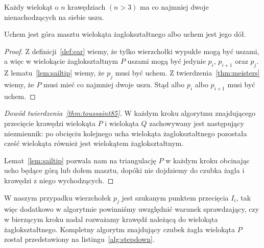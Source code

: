 \begin{twierdzenie} Każdy wielokąt
  o $n$ krawędziach $(n > 3)$ ma co najmniej dwoje nienachodzących na
  siebie uszu.
\end{twierdzenie}

\begin{lemat}\label{lem:sailmast}\emph{\cite{ToussaintInt}}
  Uchem jest góra masztu wielokąta żaglokształtnego albo uchem jest
  jego dół.
\end{lemat}

\begin{proof}
  Z definicji~\ref{def:ear} wiemy, że tylko wierzchołki wypukłe mogą
  być uszami, a więc w wielokącie żaglokształtnym $P$ uszami mogą być
  jedynie $p_i$, $p_{i+1}$ oraz $p_j$. Z lematu~\ref{lem:sailtip}
  wiemy, że $p_j$ musi być uchem. Z twierdzenia~\ref{thm:meisters}
  wiemy, że $P$ musi mieć co najmniej dwoje uszu. Stąd albo $p_i$ albo
  $p_{i+1}$ musi być uchem.
\end{proof}

\begin{proof}[Dowód twierdzenia~\ref{thm:toussaint85}]
  W każdym kroku algorytmu znajdującego przecięcie krawędzi wielokąta
  $P$ i wielokąta $Q$ zachowywany jest następujący niezmiennik: po
  obcięciu kolejnego ucha wielokąta żaglokształtnego pozostała cześć
  wielokąta również jest wielokątem żaglokształtnym.

  Lemat~\ref{lem:sailtip} pozwala nam na triangulację $P$ w każdym
  kroku obcinając ucho będące górą lub dołem masztu, dopóki nie
  dojdziemy do czubka żagla i krawędzi z niego wychodzących.
\end{proof}

W naszym przypadku wierzchołek $p_j$ jest szukanym punktem przecięcia
$I_i$, tak więc dodatkowo w algorytmie powinniśmy uwzględnić warunek
sprawdzający, czy w bierzącym kroku nadal rozważamy krawędź należącą
do wielokąta żaglokształtnego. Kompletny algorytm znajdujący czubek
żagla wielokąta $P$ został przedstawiony na
listingu~\ref{alg:stepdown}.

